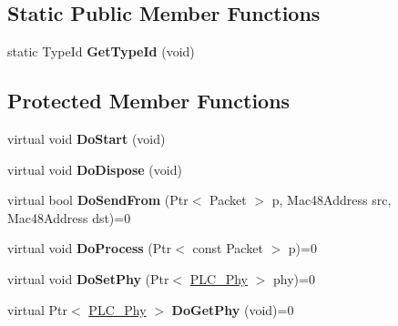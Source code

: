 \subsection*{\-Static \-Public \-Member \-Functions}
\begin{DoxyCompactItemize}
\item 
\hypertarget{classns3_1_1PLC__Mac_a9cb375d159ef8f4f98ce5ccb71e0fc55}{static \-Type\-Id {\bfseries \-Get\-Type\-Id} (void)}\label{classns3_1_1PLC__Mac_a9cb375d159ef8f4f98ce5ccb71e0fc55}

\end{DoxyCompactItemize}
\subsection*{\-Protected \-Member \-Functions}
\begin{DoxyCompactItemize}
\item 
\hypertarget{classns3_1_1PLC__Mac_ade564ab18b54b5d839561c214f9c0304}{virtual void {\bfseries \-Do\-Start} (void)}\label{classns3_1_1PLC__Mac_ade564ab18b54b5d839561c214f9c0304}

\item 
\hypertarget{classns3_1_1PLC__Mac_aa7ee0e028804b882a8563c7a8784b3b3}{virtual void {\bfseries \-Do\-Dispose} (void)}\label{classns3_1_1PLC__Mac_aa7ee0e028804b882a8563c7a8784b3b3}

\item 
\hypertarget{classns3_1_1PLC__Mac_a059f2702bc117b2cb68732489b275962}{virtual bool {\bfseries \-Do\-Send\-From} (\-Ptr$<$ \-Packet $>$ p, \-Mac48\-Address src, \-Mac48\-Address dst)=0}\label{classns3_1_1PLC__Mac_a059f2702bc117b2cb68732489b275962}

\item 
\hypertarget{classns3_1_1PLC__Mac_a3a3165e888c70bf27e5c5f763a66b939}{virtual void {\bfseries \-Do\-Process} (\-Ptr$<$ const \-Packet $>$ p)=0}\label{classns3_1_1PLC__Mac_a3a3165e888c70bf27e5c5f763a66b939}

\item 
\hypertarget{classns3_1_1PLC__Mac_a7788ec2ccb628ceb70d1bc140917a42c}{virtual void {\bfseries \-Do\-Set\-Phy} (\-Ptr$<$ \hyperlink{classns3_1_1PLC__Phy}{\-P\-L\-C\-\_\-\-Phy} $>$ phy)=0}\label{classns3_1_1PLC__Mac_a7788ec2ccb628ceb70d1bc140917a42c}

\item 
\hypertarget{classns3_1_1PLC__Mac_a6e820429841dc8e9d764d8b42b6fbc53}{virtual \-Ptr$<$ \hyperlink{classns3_1_1PLC__Phy}{\-P\-L\-C\-\_\-\-Phy} $>$ {\bfseries \-Do\-Get\-Phy} (void)=0}\label{classns3_1_1PLC__Mac_a6e820429841dc8e9d764d8b42b6fbc53}

\end{DoxyCompactItemize}
